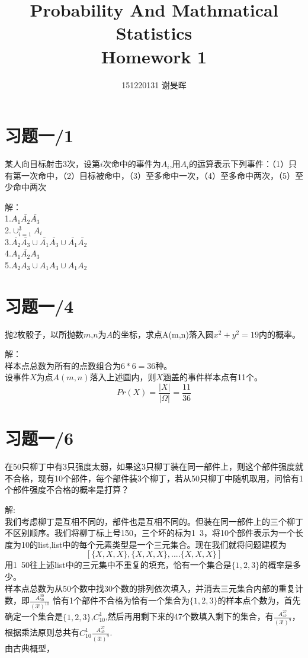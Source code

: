 \documentclass[a4paper]{ctexart}
\title{Probability And Mathmatical Statistics\\Homework 1}
\author{151220131 谢旻晖}
\date{}
\begin{document}
\maketitle
\section{习题一/1}
某人向目标射击3次，设第$i$次命中的事件为$A_i$,用$A_i$的运算表示下列事件：（1）只有第一次命中，（2）目标被命中，（3）至多命中一次，（4）至多命中两次，（5）至少命中两次

\noindent 解：\\
1.$A_{1}\bar{A_{2}}\bar{A_{3}}$\\
2.$\cup_{i=1}^{3}A_{i}$\\
3.$\bar{A_{2}}\bar{A_{3}}\cup\bar{A_{1}}\bar{A_{3}}\cup\bar{A_{1}}\bar{A_{2}}$\\
4.$\overline{A_{1}A_{2}A_{3}}$\\
5.$A_{2}A_{3}\cup A_{1}A_{3}\cup A_{1}A_{2}$

\section{习题一/4}
抛2枚骰子，以所抛数$m$,$n$为$A$的坐标，求点A(m,n)落入圆$x^2+y^2=19$内的概率。


\noindent 解：\\
\indent 样本点总数为所有的点数组合为$6*6=36$种。\\
\indent 设事件$X$为点$A(m,n)$落入上述圆内，则$X$涵盖的事件样本点有11个。\\
\[
Pr(X)=\frac{|X|}{|\Omega|}=\frac{11}{36}
\]

\section{习题一/6}
在50只柳丁中有3只强度太弱，如果这3只柳丁装在同一部件上，则这个部件强度就不合格，现有10个部件，每个部件装3个柳丁，若从50只柳丁中随机取用，问恰有1个部件强度不合格的概率是打算？


\noindent 解:\\
\indent 我们考虑柳丁是互相不同的，部件也是互相不同的。但装在同一部件上的三个柳丁不区别顺序。我们将柳丁标上号1\~50，三个坏的标为1~3，将10个部件表示为一个长度为10的list,list中的每个元素类型是一个三元集合。现在我们就将问题建模为
\[[\{X,X,X\},\{X,X,X\},....\{X,X,X\}]\]
用1~50往上述list中的三元集中不重复的填充，恰有一个集合是$\{1,2,3\}$的概率是多少。\\
\indent 样本点总数为从50个数中找30个数的排列依次填入，并消去三元集合内部的重复计数，即$\frac{A_{50}^{30}}{(3!)^{10}}$
\indent 恰有1个部件不合格为恰有一个集合为$\{1,2,3\}$的样本点个数为，首先确定一个集合是$\{1,2,3\}$,$C_{10}^1$,然后再用剩下来的47个数填入剩下的集合，有$\frac{A_{47}^{27}}{(3!)^9}$，根据乘法原则总共有$C_{10}^1 \frac{A_{47}^{27}}{(3!)^9}$.\\
\indent 由古典概型，
\end{document}
